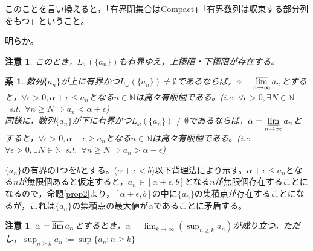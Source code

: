 \documentclass[dvipdfmx,a4j,10pt]{jsarticle}
\makeatletter
\theoremstyle{mystyle1}
\newtheorem{cor}[dfn]{系}
\theoremstyle{mystyle2}
\newtheorem{rem}{注意}
\newtheorem{note}{注意}
\renewenvironment{proof}[1][\proofname]{\par
  \pushQED{\qed}%
  \normalfont
  \topsep6\p@\@plus6\p@ \trivlist
  \item[\hskip\labelsep{\bfseries\sffamily #1}]\ignorespaces
}{%
  \popQED\endtrivlist\@endpefalse
}
\renewcommand\proofname{証明}
\makeatother
\begin{document}
このことを言い換えると，「有界閉集合はCompact」「有界数列は収束する部分列をもつ」ということ。
\begin{proof}[系\ref{cor3.6}の証明]
    明らか。
\end{proof}

\begin{note}
    このとき，$L_\omega(\{a_n\})$も有界ゆえ，上極限・下極限が存在する。
\end{note}

\newpage

\begin{framed}
\begin{cor}\label{cor3.7}
	数列$\{a_n\}$が上に有界かつ$L_\omega(\{a_n\})\neq\emptyset$であるならば，$\displaystyle\alpha=\varlimsup_{n\to\infty}a_n$とすると，$\forall\epsilon>0,\alpha+\epsilon\leq a_n$となる$n\in\mathbb{N}$は高々有限個である。(i.e. $\forall\epsilon>0,\exists N\in\mathbb{N}$\ s.t.\ $\forall n\geq N\Rightarrow a_n<\alpha+\epsilon$)\\
	同様に，数列$\{a_n\}$が下に有界かつ$L_\omega(\{a_n\})\neq\emptyset$であるならば，$\displaystyle\alpha=\varliminf_{n\to\infty}a_n$とすると，$\forall\epsilon>0,\alpha-\epsilon\geq a_n$となる$n\in\mathbb{N}$は高々有限個である。(i.e. $\forall\epsilon>0,\exists N\in\mathbb{N}$\ s.t.\ $\forall n\geq N\Rightarrow a_n>\alpha-\epsilon$)
\end{cor}
\end{framed}
\begin{proof}[系\ref{cor3.7}の証明]
    $\{a_n\}$の有界の1つを$b$とする。($\alpha+\epsilon<b$)以下背理法により示す。$\alpha+\epsilon\leq a_n$となる$n$が無限個あると仮定すると，$a_n\in [\alpha+\epsilon,b]$となる$n$が無限個存在することになるので，命題\ref{prop2}より，$[\alpha+\epsilon,b]$の中に$\{a_n\}$の集積点が存在することになるが，これは$\{a_n\}$の集積点の最大値が$\alpha$であることに矛盾する。
\end{proof}

\begin{rem}\label{rem3.8}
$\alpha=\varlimsup a_n$とするとき，$\displaystyle\alpha=\lim_{k\to\infty}\left(\sup_{n\geq k}a_n\right)$が成り立つ。ただし，$\displaystyle \sup_{n\geq k}a_n:=\sup\{a_n:n\geq k\}$
\end{rem}
\end{document}
